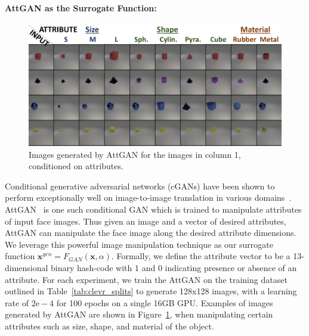     \paragraph{AttGAN as the Surrogate Function:}
    \begin{figure}
        \centering
        \includegraphics[width=\linewidth]{agat/images/attgan_outputs.pdf}
        \caption{Images generated by AttGAN for the images in column 1, conditioned on attributes.
        }
        \label{fig:attgan}
    \end{figure}
    Conditional generative adversarial networks (cGANs) have been shown to perform exceptionally well on image-to-image translation in various domains~\citep{isola2017image,zhang2017stackgan,karras2019style}.
    AttGAN~\citep{he2019attgan} is one such conditional GAN which is trained to manipulate attributes of input face images.
    Thus given an image and a vector of desired attributes, AttGAN can manipulate the face image along the desired attribute dimensions.
    We leverage this powerful image manipulation technique as our surrogate function $\mathbf{x}^{gen} = F_{GAN}(\mathbf{x}, \alpha)$.
    Formally, we define the attribute vector to be a 13-dimensional binary hash-code with 1 and 0 indicating presence or absence of an attribute.
    For each experiment, we train the AttGAN on the training dataset outlined in Table~\ref{tab:clevr_splits} to generate 128x128 images, with a learning rate of $2\mathrm{e-}4$ for 100 epochs on a single 16GB GPU.
    Examples of images generated by AttGAN are shown in Figure~\ref{fig:attgan}, when manipulating certain attributes such as size, shape, and material of the object.

